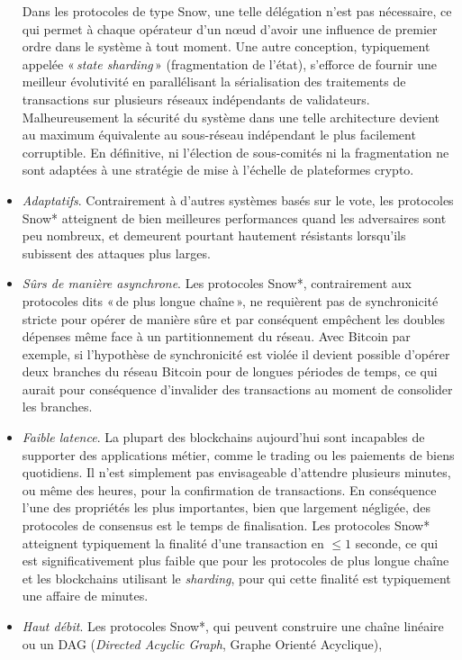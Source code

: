 \documentclass[runningheads,francais,a4paper]{llncs}
\begin{document}
\begin{itemize}
Dans les protocoles de type Snow, une telle délégation n'est pas nécessaire, ce qui permet à chaque opérateur d'un nœud
d'avoir une influence de premier ordre dans le système à tout moment. Une autre conception, typiquement appelée
«\,\emph{state sharding}\,» (fragmentation de l'état), s'efforce de fournir une meilleur évolutivité en parallélisant la sérialisation des traitements de transactions
sur plusieurs réseaux indépendants de validateurs. Malheureusement la sécurité du système dans une telle architecture
devient au maximum équivalente au sous-réseau indépendant le plus facilement corruptible. En définitive, ni l'élection
de sous-comités ni la fragmentation ne sont adaptées à une stratégie de mise à l'échelle de plateformes crypto.
\item \textit{Adaptatifs}. Contrairement à d'autres systèmes basés sur le vote, les protocoles Snow* atteignent de bien
meilleures performances quand les adversaires sont peu nombreux, et demeurent pourtant hautement résistants lorsqu'ils
subissent des attaques plus larges.
\item \textit{Sûrs de manière asynchrone}. Les protocoles Snow*, contrairement aux protocoles dits «\,de plus longue
chaîne\,», ne requièrent pas de synchronicité stricte pour opérer de manière sûre et par conséquent empêchent les doubles
dépenses même face à un partitionnement du réseau. Avec Bitcoin par exemple, si l'hypothèse de synchronicité est violée
il devient possible d'opérer deux branches du réseau Bitcoin pour de longues périodes de temps, ce qui aurait pour
conséquence d'invalider des transactions au moment de consolider les branches.
\item \textit{Faible latence}. La plupart des blockchains aujourd'hui sont incapables de supporter des applications
métier, comme le trading ou les paiements de biens quotidiens. Il n'est simplement pas envisageable d'attendre plusieurs
minutes, ou même des heures, pour la confirmation de transactions. En conséquence l'une des propriétés les plus importantes,
bien que largement négligée, des protocoles de consensus est le temps de finalisation. Les protocoles Snow* atteignent
typiquement la finalité d'une transaction en $\leq 1$ seconde, ce qui est significativement plus faible que pour les
protocoles de plus longue chaîne et les blockchains utilisant le \emph{sharding}, pour qui cette finalité est typiquement une
affaire de minutes.
\item \textit{Haut débit}. Les protocoles Snow*, qui peuvent construire une chaîne linéaire ou un DAG (\emph{Directed Acyclic Graph}, Graphe Orienté Acyclique),

\end{itemize}
\end{document}
